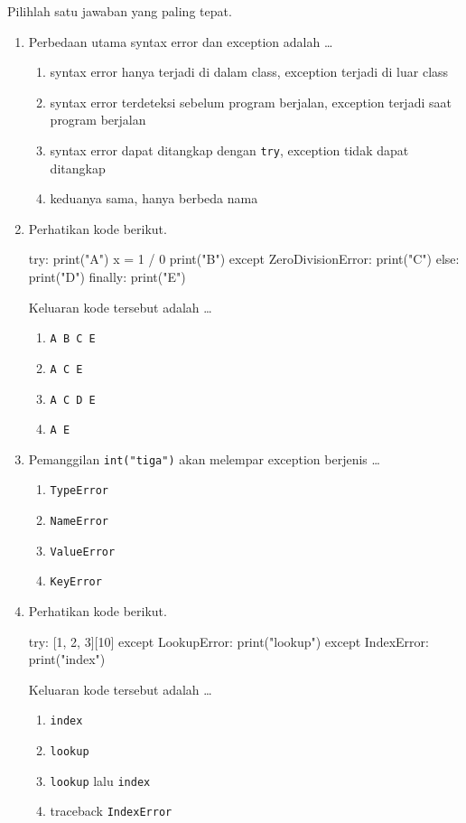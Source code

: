 Pilihlah satu jawaban yang paling tepat.

\begin{enumerate}
  \item Perbedaan utama syntax error dan exception adalah \ldots
  \begin{enumerate}[label=\alph*.,itemsep=0pt]
    \item syntax error hanya terjadi di dalam class, exception terjadi di luar class
    \item syntax error terdeteksi sebelum program berjalan, exception terjadi saat program berjalan
    \item syntax error dapat ditangkap dengan \texttt{try}, exception tidak dapat ditangkap
    \item keduanya sama, hanya berbeda nama
  \end{enumerate}

  \item Perhatikan kode berikut.
\begin{kode}[Soal 2]
try:
    print("A")
    x = 1 / 0
    print("B")
except ZeroDivisionError:
    print("C")
else:
    print("D")
finally:
    print("E")
\end{kode}
  Keluaran kode tersebut adalah \ldots
  \begin{enumerate}[label=\alph*.,itemsep=0pt]
    \item \texttt{A B C E}
    \item \texttt{A C E}
    \item \texttt{A C D E}
    \item \texttt{A E}
  \end{enumerate}

  \item Pemanggilan \texttt{int("tiga")} akan melempar exception berjenis \ldots
  \begin{enumerate}[label=\alph*.,itemsep=0pt]
    \item \texttt{TypeError}
    \item \texttt{NameError}
    \item \texttt{ValueError}
    \item \texttt{KeyError}
  \end{enumerate}

  \item Perhatikan kode berikut.
\begin{kode}[Soal 4]
try:
    [1, 2, 3][10]
except LookupError:
    print("lookup")
except IndexError:
    print("index")
\end{kode}
  Keluaran kode tersebut adalah \ldots
  \begin{enumerate}[label=\alph*.,itemsep=0pt]
    \item \texttt{index}
    \item \texttt{lookup}
    \item \texttt{lookup} lalu \texttt{index}
    \item traceback \texttt{IndexError}
  \end{enumerate}


\end{enumerate}
